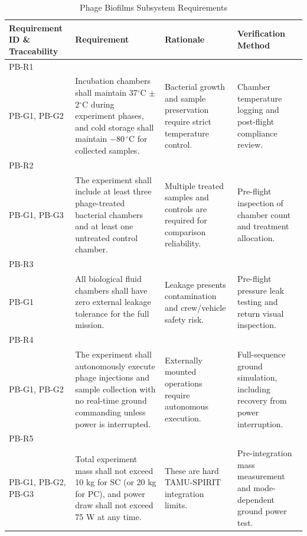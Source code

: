 \documentclass[conf]{new-aiaa}
\begin{document}
\begin{table}[H]
    \centering
    \footnotesize
    \setlength{\tabcolsep}{4pt}
    \renewcommand{\arraystretch}{1.15}
    \begin{tabularx}{\textwidth}{@{}>{\raggedright\arraybackslash}m{2.4cm}YYY@{}}
    \toprule
    \textbf{Requirement ID \& Traceability} & \textbf{Requirement} & \textbf{Rationale} & \textbf{Verification Method} \\
    \midrule
    PB-R1\\PB-G1, PB-G2 &
    Incubation chambers shall maintain 37$^{\circ}$C $\pm$ 2$^{\circ}$C during experiment phases, and cold storage shall maintain $-80\,^{\circ}$C for collected samples. &
    Bacterial growth and sample preservation require strict temperature control. &
    Chamber temperature logging and post-flight compliance review. \\ \hline

    PB-R2\\PB-G1, PB-G3 &
    The experiment shall include at least three phage-treated bacterial chambers and at least one untreated control chamber. &
    Multiple treated samples and controls are required for comparison reliability. &
    Pre-flight inspection of chamber count and treatment allocation. \\ \hline

    PB-R3\\PB-G1 &
    All biological fluid chambers shall have zero external leakage tolerance for the full mission. &
    Leakage presents contamination and crew/vehicle safety risk. &
    Pre-flight pressure leak testing and return visual inspection. \\ \hline

    PB-R4\\PB-G1, PB-G2 &
    The experiment shall autonomously execute phage injections and sample collection with no real-time ground commanding unless power is interrupted. &
    Externally mounted operations require autonomous execution. &
    Full-sequence ground simulation, including recovery from power interruption. \\ \hline

    PB-R5\\PB-G1, PB-G2, PB-G3 &
    Total experiment mass shall not exceed 10 kg for SC (or 20 kg for PC), and power draw shall not exceed 75 W at any time. &
    These are hard TAMU-SPIRIT integration limits. &
    Pre-integration mass measurement and mode-dependent ground power test. \\
    \bottomrule
    \end{tabularx}
    \caption{Phage Biofilms Subsystem Requirements}
    \label{tab:pb_requirements}
\end{table}
\end{document}
